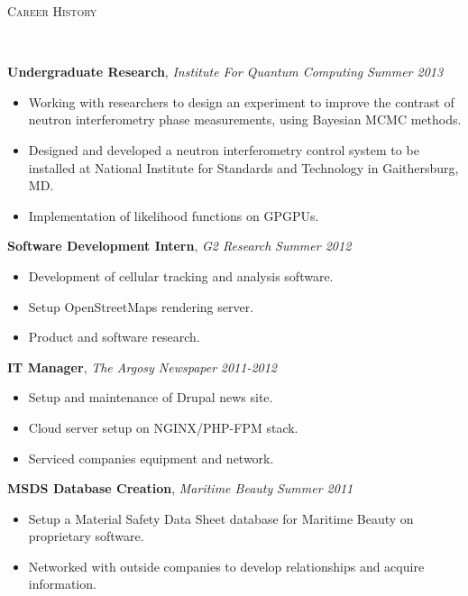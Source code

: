 \documentclass[9pt]{article}
\newenvironment{changemargin}[2]{%
  \begin{list}{}{%
    \setlength{\topsep}{0pt}%
    \setlength{\leftmargin}{#1}%
    \setlength{\rightmargin}{#2}%
    \setlength{\listparindent}{\parindent}%
    \setlength{\itemindent}{\parindent}%
    \setlength{\parsep}{\parskip}%
  }%
  \item[]}{\end{list}
}
\newcommand{\lineover}{
	\begin{changemargin}{-0.05in}{-0.05in}
		\vspace*{-8pt}
		\hrulefill \\
		\vspace*{-2pt}
	\end{changemargin}
}
\newcommand{\header}[1]{
	\begin{changemargin}{-0.5in}{-0.5in}
		\scshape{#1}\\
  	\lineover
	\end{changemargin}
}
\newenvironment{body} {
	\vspace*{-16pt}
	\begin{changemargin}{-0.25in}{-0.5in}
  }	
	{\end{changemargin}
}
\begin{document}
\smallskip


\header{Career History}

\begin{body}
	\vspace{14pt}
	\textbf{Undergraduate Research}, \emph{Institute For Quantum Computing} \hfill \emph{Summer 2013}\\
	\vspace*{-4pt}
	\begin{itemize} \itemsep -0pt  %
		\item Working with researchers to design an experiment to improve the contrast of neutron interferometry phase measurements, using Bayesian MCMC methods.  
		\item Designed and developed a neutron interferometry control system to be installed at National Institute for Standards and Technology in Gaithersburg, MD.
		\item Implementation of likelihood functions on GPGPUs. 
	\end{itemize}
	\textbf{Software Development Intern}, \emph{G2 Research} \hfill \emph{Summer 2012}\\
	\vspace*{-4pt}
	\begin{itemize} \itemsep -0pt  %
		\item Development of cellular tracking and analysis software.
		\item Setup OpenStreetMaps rendering server.
		\item Product and software research.
	\end{itemize}

	\textbf {IT Manager}, \emph{The Argosy Newspaper} \hfill \emph{2011-2012}\\
	\vspace*{-4pt}
	\begin{itemize} \itemsep -0pt
		\item Setup and maintenance of Drupal news site.
		\item Cloud server setup on NGINX/PHP-FPM stack. 
		\item Serviced companies equipment and network. 
	\end{itemize}

	\textbf {MSDS Database Creation}, \emph{Maritime Beauty} \hfill \emph{Summer 2011}\\
	\vspace*{-4pt}
	\begin{itemize} \itemsep -0pt
		\item Setup a Material Safety Data Sheet database for Maritime Beauty on proprietary software. 
		\item Networked with outside companies to develop relationships and acquire information. 
	\end{itemize}


\end{body}
\end{document}
